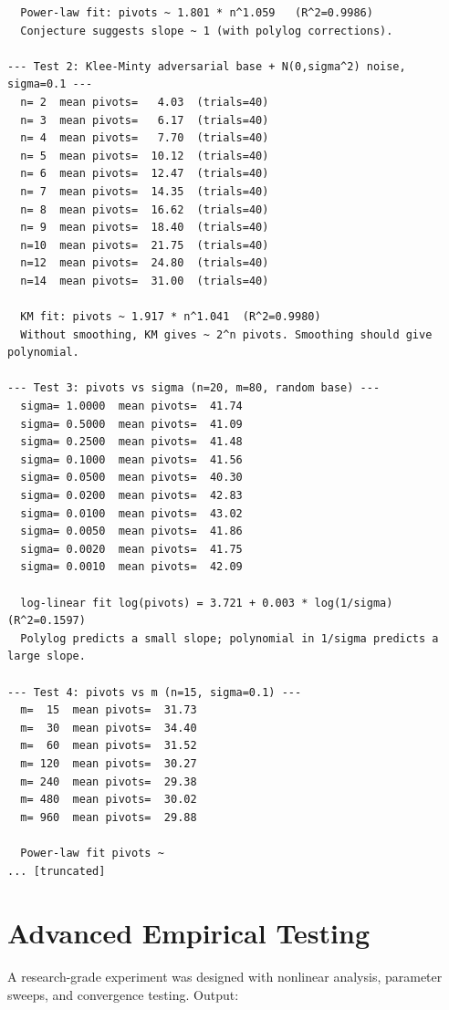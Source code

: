 \documentclass[11pt]{article}
\begin{document}
\begin{lstlisting}
  Power-law fit: pivots ~ 1.801 * n^1.059   (R^2=0.9986)
  Conjecture suggests slope ~ 1 (with polylog corrections).

--- Test 2: Klee-Minty adversarial base + N(0,sigma^2) noise, sigma=0.1 ---
  n= 2  mean pivots=   4.03  (trials=40)
  n= 3  mean pivots=   6.17  (trials=40)
  n= 4  mean pivots=   7.70  (trials=40)
  n= 5  mean pivots=  10.12  (trials=40)
  n= 6  mean pivots=  12.47  (trials=40)
  n= 7  mean pivots=  14.35  (trials=40)
  n= 8  mean pivots=  16.62  (trials=40)
  n= 9  mean pivots=  18.40  (trials=40)
  n=10  mean pivots=  21.75  (trials=40)
  n=12  mean pivots=  24.80  (trials=40)
  n=14  mean pivots=  31.00  (trials=40)

  KM fit: pivots ~ 1.917 * n^1.041  (R^2=0.9980)
  Without smoothing, KM gives ~ 2^n pivots. Smoothing should give polynomial.

--- Test 3: pivots vs sigma (n=20, m=80, random base) ---
  sigma= 1.0000  mean pivots=  41.74
  sigma= 0.5000  mean pivots=  41.09
  sigma= 0.2500  mean pivots=  41.48
  sigma= 0.1000  mean pivots=  41.56
  sigma= 0.0500  mean pivots=  40.30
  sigma= 0.0200  mean pivots=  42.83
  sigma= 0.0100  mean pivots=  43.02
  sigma= 0.0050  mean pivots=  41.86
  sigma= 0.0020  mean pivots=  41.75
  sigma= 0.0010  mean pivots=  42.09

  log-linear fit log(pivots) = 3.721 + 0.003 * log(1/sigma)  (R^2=0.1597)
  Polylog predicts a small slope; polynomial in 1/sigma predicts a large slope.

--- Test 4: pivots vs m (n=15, sigma=0.1) ---
  m=  15  mean pivots=  31.73
  m=  30  mean pivots=  34.40
  m=  60  mean pivots=  31.52
  m= 120  mean pivots=  30.27
  m= 240  mean pivots=  29.38
  m= 480  mean pivots=  30.02
  m= 960  mean pivots=  29.88

  Power-law fit pivots ~
... [truncated]
\end{lstlisting}


\section{Advanced Empirical Testing}

A research-grade experiment was designed with nonlinear analysis, parameter sweeps,
and convergence testing. Output:
\end{document}
